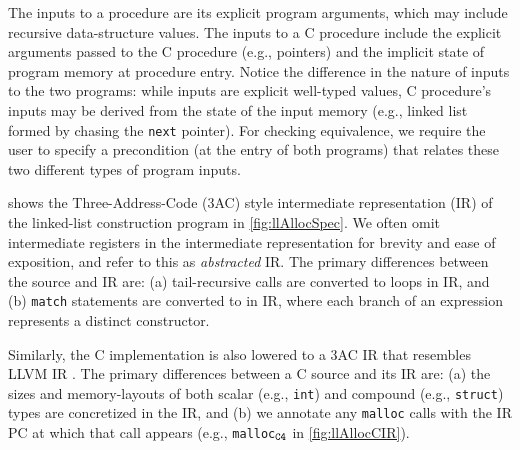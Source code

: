 The inputs to
a \SpecL{} procedure
are its explicit program arguments, which may include
recursive data-structure values.  The inputs to a
C procedure include the explicit arguments passed to the C procedure (e.g., pointers)
and the implicit state of program memory at procedure entry.
Notice the difference in the nature of inputs to the two programs: while
\SpecL{} inputs are explicit well-typed values, C procedure's
inputs may be
derived from the state of the input memory (e.g., linked list formed by chasing the
{\tt next} pointer).
For checking equivalence, we require
the user to specify a precondition (at the entry of both
programs) that relates these two different
types of program inputs.

 shows the Three-Address-Code (3AC) style
intermediate representation (IR) of the linked-list construction \SpecL{}
program in \cref{fig:llAllocSpec}.
We often omit intermediate registers in the intermediate representation
for brevity and ease of exposition, and refer to this as {\em abstracted} IR.
The primary differences between
the \SpecL{} source and IR are: (a) tail-recursive calls
are converted to loops in IR, and (b) {\tt match} statements
are converted to \sumDtor{} in IR,
where each branch of an \sumDtor{}
expression represents a distinct constructor.

Similarly, the C implementation is also lowered to a 3AC IR
that resembles LLVM IR \cite{llvm_langref_home}. The primary differences between a C
source and its IR are: (a) the sizes and
memory-layouts of both scalar (e.g., {\tt int}) and
compound (e.g., {\tt struct}) types are concretized in the IR,
and (b) we annotate any {\tt malloc} calls with
the IR PC at which that call appears
(e.g., {\tt malloc$_{\tt C4}$} in \cref{fig:llAllocCIR}).


